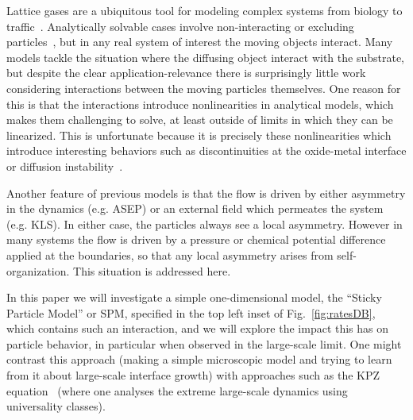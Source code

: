 \documentclass[
reprint, amsmath,amssymb,
]{revtex4-1}
\begin{document}
Lattice gases are a ubiquitous tool for modeling complex systems from
biology to traffic~\cite{1742-5468-2011-07-P07007, Mobilia2007,
  tegner2015high, zhu2012atomic, DealGrove1965, MottCabrera1949,
  Buzzaccaro2007}.  Analytically solvable cases involve
non-interacting or excluding particles~\cite{ladd1988application,
  liggett1985interacting, BenNaim1999, Shandarin1989, Frachebourg1999,
  Frachebourg2000}, but in any real system of interest the moving
objects interact. Many models tackle the situation where the diffusing
object interact with the substrate, but despite the clear
application-relevance there is surprisingly little work considering
interactions between the moving particles themselves.  One reason for
this is that the interactions introduce nonlinearities in analytical
models, which makes them challenging to solve, at least outside of
limits in which they can be linearized. This is unfortunate because it
is precisely these nonlinearities which introduce interesting
behaviors such as discontinuities at the oxide-metal interface or
diffusion instability~\cite{Obukhovsky2017, Gorokhova2010}.

Another feature of previous models is that the flow is driven by
either asymmetry in the dynamics (e.g. ASEP) or an external field
which permeates the system (e.g. KLS).  In either case, the particles
always see a local asymmetry.  However in many systems the flow is
driven by a pressure or chemical potential difference applied at the
boundaries, so that any local asymmetry arises from self-organization.
This situation is addressed here.

In this paper we will investigate a simple one-dimensional model, the
``Sticky Particle Model'' or SPM, specified in the top left inset of
Fig.~\ref{fig:ratesDB}, which contains such an interaction, and we
will explore the impact this has on particle behavior, in particular
when observed in the large-scale limit.  One might contrast this
approach (making a simple microscopic model and trying to learn from
it about large-scale interface growth) with approaches such as the KPZ
equation~\cite{PhysRevLett.56.889, PhysRevA.38.4271, Sasamoto2010}
(where one analyses the extreme large-scale dynamics using
universality classes).
\end{document}
